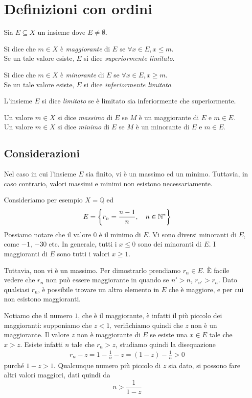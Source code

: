 \documentclass[a4paper]{article}
\begin{document}
\pagebreak 

\section{Definizioni con ordini}

\begin{radioactive}
Sia \(E \subseteq X\) un insieme dove \(E \neq \emptyset\).

Si dice che \(m\in X\) è \textit{maggiorante} di \(E\) se \(\forall x \in E, x \leq m\). \\
Se un tale valore esiste, \(E\) si dice \textit{superiormente limitato}.

Si dice che \(m\in X\) è \textit{minorante} di \(E\) se \(\forall x \in E, x \geq m\). \\
Se un tale valore esiste, \(E\) si dice \textit{inferiormente limitato}.

L'insieme \(E\) si dice \textit{limitato} se è limitato sia inferiormente che superiormente.

Un valore \(m\in X\) si dice \textit{massimo} di \(E\) se \(M\) è un maggiorante di \(E\) e \(m\in E\). \\
Un valore \(m\in X\) si dice \textit{minimo} di \(E\) se \(M\) è un minorante di \(E\) e \(m\in E\).
\end{radioactive}
\subsection{Considerazioni}
\begin{radioactive}
Nel caso in cui l'insieme \(E\) sia finito, vi è un massimo ed un minimo.
Tuttavia, in caso contrario, valori massimi e minimi non esistono necessariamente.

Consideriamo per esempio \(X=\mathbb{Q}\) ed
\[
    E = \left\{ r_n = \frac{n-1}{n}, \quad n\in{\mathbb{N}}^* \right\}
\]
Possiamo notare che il valore \(0\) è il minimo di \(E\).
Vi sono diversi minoranti di \(E\), come \(-1\), \(-30\) etc. In generale, tutti i \(x\leq 0\) sono
dei minoranti di \(E\).
I maggioranti di \(E\) sono tutti i valori \( x \geq 1\).

Tuttavia, non vi è un massimo. Per dimostrarlo prendiamo \(r_n \in E\).
È facile vedere che \(r_n\) non può essere maggiorante in quando se \(n'>n\), \(r_{n'}>r_n\).
Dato qualsiasi \(r_n\), è possibile trovare un altro elemento in \(E\) che è maggiore, e per cui non
esistono maggioranti.

Notiamo che il numero \(1\), che è il maggiorante, è infatti il più piccolo dei maggioranti:
supponiamo che \(z<1\), verifichiamo quindi che \(z\) non è un maggiorante.
Il valore \(z\) non è maggiorante di \(E\) se esiste una \(x \in E\) tale che \(x > z\).
Esiste infatti \(n\) tale che \(r_n > z\), studiamo quindi la disequazione
\begin{align*}
    r_n - z = 1 - \frac{1}{n} - z = (1-z) - \frac{1}{n} > 0
\end{align*}
purché \(1-z>1\). Qualcunque numero più piccolo di \(z\) sia dato, si possono fare
altri valori maggiori, dati quindi da
\[
    n > \frac{1}{1-z}
\]
\end{radioactive}
\end{document}
